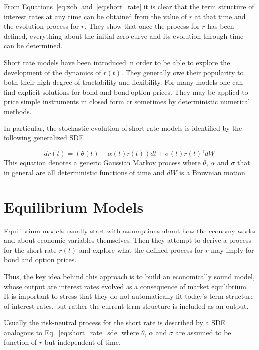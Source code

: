 
From Equations~\ref{eq:zcb} and~\ref{eq:short_rate} it is clear that the term structure of interest rates at any time can be obtained from the value of $r$ at that time and the evolution process for $r$. They show that once the process for $r$ has been defined, everything about the initial zero curve and its evolution through time can be determined.

Short rate models have been introduced in order to be able to explore the development of the dynamics of $r(t)$. They generally owe their popularity to both their high degree of tractability and flexibility. For many models one can find explicit solutions for bond and bond option prices. They may be applied to price simple instruments in closed form or sometimes by deterministic numerical methods.

In particular, the stochastic evolution of short rate models is identified by the following generalized SDE

\begin{equation}
dr(t) = (\theta(t) − \alpha(t)r(t)) dt + \sigma(t)r(t)^{\gamma} dW
\label{eq:short_rate_sde}
\end{equation}
This equation denotes a generic Gaussian Markov process where $\theta$, $\alpha$ and $\sigma$ that in general are all deterministic functions of time and $dW$ is a Brownian motion.

\section{Equilibrium Models}\label{equilibrium-models}

Equilibrium models usually start with assumptions about how the economy works and about economic variables themselves. Then they attempt to derive a process for the short rate $r(t)$ and explore what the defined process for $r$ may imply for bond and option prices.

Thus, the key idea behind this approach is to build an economically sound model, whose output are interest rates evolved as a consequence of market equilibrium. It is important to stress that they do not automatically fit today’s term structure of interest rates, but rather the current term structure is included as an output. 

Usually the risk-neutral process for the short rate is described by a SDE analogous to Eq.~\ref{eq:short_rate_sde} where $\theta$, $\alpha$ and $\sigma$ are assumed to be function of $r$ but independent of time.

